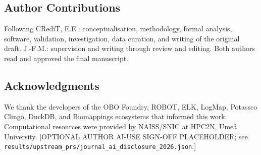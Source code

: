 \documentclass[10pt]{article}
\theoremstyle{accentdef}
\begin{document}
\subsection*{Author Contributions}
Following CRediT, E.E.: conceptualisation, methodology, formal analysis, software, validation, investigation, data curation, and writing of the original draft. J.-F.M.: supervision and writing through review and editing. Both authors read and approved the final manuscript.

\subsection*{Acknowledgments}
We thank the developers of the OBO Foundry, ROBOT, ELK, LogMap, Potassco Clingo, DuckDB, and Biomappings ecosystems that informed this work. Computational resources were provided by NAISS/SNIC at HPC2N, Ume{\aa} University. [OPTIONAL AUTHOR AI-USE SIGN-OFF PLACEHOLDER; see \texttt{results/upstream\_prs/journal\_ai\_disclosure\_2026.json}.]
\end{document}
